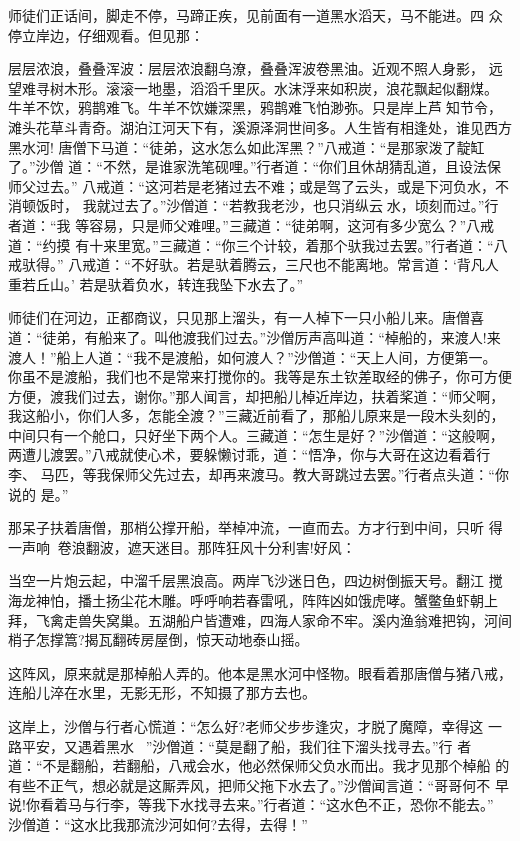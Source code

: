 师徒们正话间，脚走不停，马蹄正疾，见前面有一道黑水滔天，马不能进。四
众停立岸边，仔细观看。但见那：

层层浓浪，叠叠浑波：层层浓浪翻乌潦，叠叠浑波卷黑油。近观不照人身影，
远望难寻树木形。滚滚一地墨，滔滔千里灰。水沫浮来如积炭，浪花飘起似翻煤。
牛羊不饮，鸦鹊难飞。牛羊不饮嫌深黑，鸦鹊难飞怕渺弥。只是岸上芦知节令，
滩头花草斗青奇。湖泊江河天下有，溪源泽洞世间多。人生皆有相逢处，谁见西方
黑水河!
唐僧下马道：“徒弟，这水怎么如此浑黑？”八戒道：“是那家泼了靛缸了。”沙僧
道：“不然，是谁家洗笔砚哩。”行者道：“你们且休胡猜乱道，且设法保师父过去。”
八戒道：“这河若是老猪过去不难；或是驾了云头，或是下河负水，不消顿饭时，
我就过去了。”沙僧道：“若教我老沙，也只消纵云水，顷刻而过。”行者道：“我
等容易，只是师父难哩。”三藏道：“徒弟啊，这河有多少宽么？”八戒道：“约摸
有十来里宽。”三藏道：“你三个计较，着那个驮我过去罢。”行者道：“八戒驮得。”
八戒道：“不好驮。若是驮着腾云，三尺也不能离地。常言道：‘背凡人重若丘山。’
若是驮着负水，转连我坠下水去了。”

师徒们在河边，正都商议，只见那上溜头，有一人棹下一只小船儿来。唐僧喜
道：“徒弟，有船来了。叫他渡我们过去。”沙僧厉声高叫道：“棹船的，来渡人!来
渡人！”船上人道：“我不是渡船，如何渡人？”沙僧道：“天上人间，方便第一。
你虽不是渡船，我们也不是常来打搅你的。我等是东土钦差取经的佛子，你可方便
方便，渡我们过去，谢你。”那人闻言，却把船儿棹近岸边，扶着桨道：“师父啊，
我这船小，你们人多，怎能全渡？”三藏近前看了，那船儿原来是一段木头刻的，
中间只有一个舱口，只好坐下两个人。三藏道：“怎生是好？”沙僧道：“这般啊，
两遭儿渡罢。”八戒就使心术，要躲懒讨乖，道：“悟净，你与大哥在这边看着行李、
马匹，等我保师父先过去，却再来渡马。教大哥跳过去罢。”行者点头道：“你说的
是。”

那呆子扶着唐僧，那梢公撑开船，举棹冲流，一直而去。方才行到中间，只听
得一声响，卷浪翻波，遮天迷目。那阵狂风十分利害!好风：

当空一片炮云起，中溜千层黑浪高。两岸飞沙迷日色，四边树倒振天号。翻江
搅海龙神怕，播土扬尘花木雕。呼呼响若春雷吼，阵阵凶如饿虎哮。蟹鳖鱼虾朝上
拜，飞禽走兽失窝巢。五湖船户皆遭难，四海人家命不牢。溪内渔翁难把钩，河间
梢子怎撑篙?揭瓦翻砖房屋倒，惊天动地泰山摇。

这阵风，原来就是那棹船人弄的。他本是黑水河中怪物。眼看着那唐僧与猪八戒，
连船儿淬在水里，无影无形，不知摄了那方去也。

这岸上，沙僧与行者心慌道：“怎么好?老师父步步逢灾，才脱了魔障，幸得这
一路平安，又遇着黑水！”沙僧道：“莫是翻了船，我们往下溜头找寻去。”行
者道：“不是翻船，若翻船，八戒会水，他必然保师父负水而出。我才见那个棹船
的有些不正气，想必就是这厮弄风，把师父拖下水去了。”沙僧闻言道：“哥哥何不
早说!你看着马与行李，等我下水找寻去来。”行者道：“这水色不正，恐你不能去。”
沙僧道：“这水比我那流沙河如何?去得，去得！”

